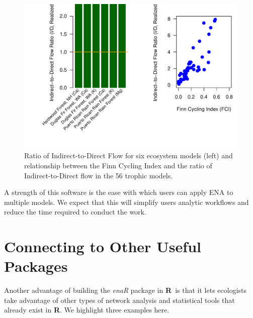 \documentclass[article]{jss}
\newcommand{\R}{\textbf{R}}
\begin{document}
\begin{Schunk}
\end{Schunk}


\begin{figure}
  \center
\includegraphics{enaR-vignette-052}
\caption{Ratio of Indirect-to-Direct Flow for six ecosystem models
  (left) and relationship between the Finn Cycling Index and the ratio
  of Indirect-to-Direct flow in the 56 trophic models.} \label{fig:aec}
\end{figure}

A strength of this software is the ease with which users can apply ENA
to multiple models.  We expect that this will simplify users
analytic workflows and reduce the time required to conduct the work.


\section{Connecting to Other Useful Packages}
Another advantage of building the \textit{enaR} package in \R\ is that
it lets ecologists take advantage of other types of network analysis
and statistical tools that already exist in \R.  We highlight three
examples here.
\end{document}
